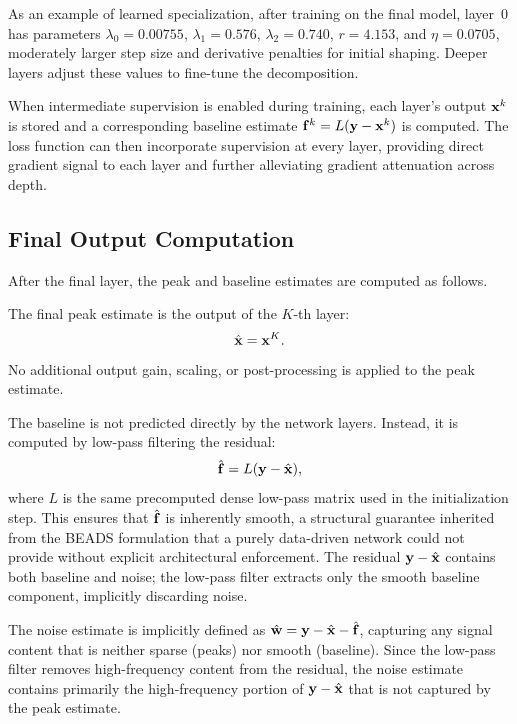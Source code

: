 As an example of learned specialization, after training on the final model, layer~0 has parameters $\lambda_0 = 0.00755$, $\lambda_1 = 0.576$, $\lambda_2 = 0.740$, $r = 4.153$, and $\eta = 0.0705$, moderately larger step size and derivative penalties for initial shaping. Deeper layers adjust these values to fine-tune the decomposition.

When intermediate supervision is enabled during training, each layer's output $\mathbf{x}^k$ is stored and a corresponding baseline estimate $\mathbf{f}^k = L(\mathbf{y} - \mathbf{x}^k)$ is computed. The loss function can then incorporate supervision at every layer, providing direct gradient signal to each layer and further alleviating gradient attenuation across depth.


\subsection{Final Output Computation}
\label{sec:method_output}

After the final layer, the peak and baseline estimates are computed as follows.

The final peak estimate is the output of the $K$-th layer:
\begin{equation}
    \hat{\mathbf{x}} = \mathbf{x}^K.
\end{equation}
No additional output gain, scaling, or post-processing is applied to the peak estimate.

The baseline is not predicted directly by the network layers. Instead, it is computed by low-pass filtering the residual:
\begin{equation}
    \hat{\mathbf{f}} = L(\mathbf{y} - \hat{\mathbf{x}}),
    \label{eq:baseline_output}
\end{equation}
where $L$ is the same precomputed dense low-pass matrix used in the initialization step. This ensures that $\hat{\mathbf{f}}$ is inherently smooth, a structural guarantee inherited from the BEADS formulation that a purely data-driven network could not provide without explicit architectural enforcement. The residual $\mathbf{y} - \hat{\mathbf{x}}$ contains both baseline and noise; the low-pass filter extracts only the smooth baseline component, implicitly discarding noise.

The noise estimate is implicitly defined as $\hat{\mathbf{w}} = \mathbf{y} - \hat{\mathbf{x}} - \hat{\mathbf{f}}$, capturing any signal content that is neither sparse (peaks) nor smooth (baseline). Since the low-pass filter removes high-frequency content from the residual, the noise estimate contains primarily the high-frequency portion of $\mathbf{y} - \hat{\mathbf{x}}$ that is not captured by the peak estimate.


